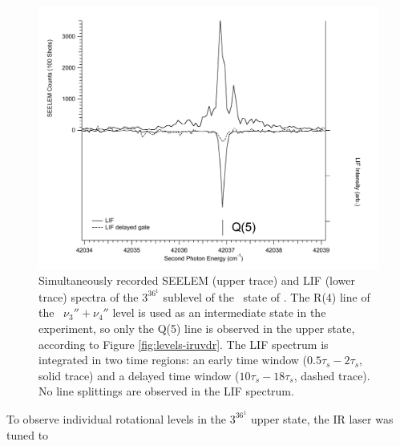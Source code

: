 \documentclass[12pt]{mitthesis}
\begin{document}
\begin{figure}
  \caption{Simultaneously recorded SEELEM (upper trace) and LIF (lower
    trace) spectra of the $3^36^1$  sublevel of the \astate\
    state of .  The R(4) line of the \xstate\ $\nu_3'' +
    \nu_4''$ level is used as an intermediate state in the experiment,
    so only the Q(5) line is observed in the upper state, according to
    Figure \ref{fig:levels-iruvdr}.  The LIF spectrum is integrated in
    two time regions: an early time window ($0.5\tau_s-2\tau_s$, solid
    trace) and a delayed time window ($10\tau_s-18\tau_s$, dashed
    trace).  No line splittings are observed in the LIF spectrum.}
  \label{fig:3361-q5}
  \centering
  \includegraphics[width=6in]{spectrum-3361-q5-split.pdf}
\end{figure}


To observe individual rotational levels in the $3^36^1$  upper
state, the IR laser was tuned to












\end{document}

